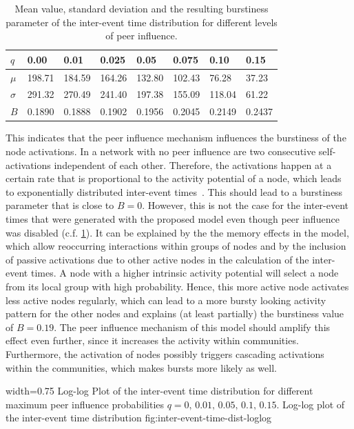 \begin{table}
\centering
\begin{tabular}{llllllll}
\( q \) & 0.00 & 0.01 & 0.025 & 0.05 & 0.075 & 0.10 & 0.15 \\ \hline
\( \mu \) & 198.71 & 184.59 & 164.26 & 132.80 & 102.43 & 76.28 & 37.23 \\ \hline
\( \sigma \) & 291.32 & 270.49 & 241.40 & 197.38 & 155.09 & 118.04 & 61.22 \\ \hline
\( B \) & 0.1890 & 0.1888 & 0.1902 & 0.1956 & 0.2045 & 0.2149 & 0.2437
\end{tabular}

\caption[Burstiness of inter-event time distributions]{Mean value, standard deviation and the resulting burstiness parameter of the inter-event time distribution for different levels of peer influence.}
\label{tbl:burstiness-parameter}
\end{table}


This indicates that the peer influence mechanism influences the burstiness of the node activations.
In a network with no peer influence are two consecutive self-activations independent of each other.
Therefore, the activations happen at a certain rate that is proportional to the activity potential of a node, which leads to exponentially distributed inter-event times~\cite{Moinet2016}.
This should lead to a burstiness parameter that is close to \( B = 0 \).
However, this is not the case for the inter-event times that were generated with the proposed model even though peer influence was disabled (c.f. \cref{tbl:burstiness-parameter}).
It can be explained by the the memory effects in the model, which allow reoccurring interactions within groups of nodes and by the inclusion of passive activations due to other active nodes in the calculation of the inter-event times.
A node with a higher intrinsic activity potential will select a node from its local group with high probability.
Hence, this more active node activates less active nodes regularly, which can lead to a more bursty looking activity pattern for the other nodes and explains (at least partially) the burstiness value of \( B = 0.19 \).
The peer influence mechanism of this model should amplify this effect even further, since it increases the activity within communities.
Furthermore, the activation of nodes possibly triggers cascading activations within the communities, which makes bursts more likely as well.


      {width=0.75\textwidth}
      {Log-log Plot of the inter-event time distribution for different maximum peer influence probabilities \( q = 0, \, 0.01, \, 0.05, \, 0.1, \, 0.15\).}
      {Log-log plot of the inter-event time distribution}
      {fig:inter-event-time-dist-loglog}


